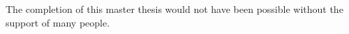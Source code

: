 The completion of this master thesis would not have been possible without the support of many people.